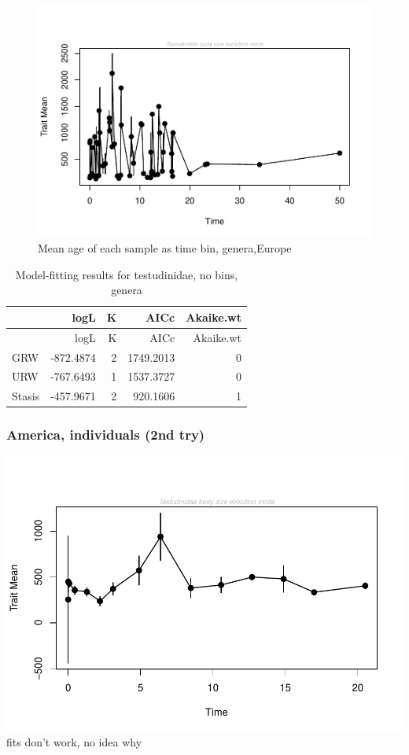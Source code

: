 \documentclass[]{article}
\begin{document}
\begin{figure}[htbp]
\centering
\includegraphics{MA_JJ_files/figure-latex/paleoTS with different time bins, no bins, genera, Europe-1.pdf}
\caption{Mean age of each sample as time bin, genera,Europe}
\end{figure}

\begin{longtable}[]{@{}lrrrr@{}}
\caption{Model-fitting results for testudinidae, no bins,
genera}\tabularnewline
\toprule
& logL & K & AICc & Akaike.wt\tabularnewline
\midrule
\endfirsthead
\toprule
& logL & K & AICc & Akaike.wt\tabularnewline
\midrule
\endhead
GRW & -872.4874 & 2 & 1749.2013 & 0\tabularnewline
URW & -767.6493 & 1 & 1537.3727 & 0\tabularnewline
Stasis & -457.9671 & 2 & 920.1606 & 1\tabularnewline
\bottomrule
\end{longtable}

\newpage

\subsubsection{America, individuals (2nd
try)}\label{america-individuals-2nd-try}

\includegraphics{MA_JJ_files/figure-latex/paleoTS, individuals, America-1.pdf}
fits don't work, no idea why
\end{document}
